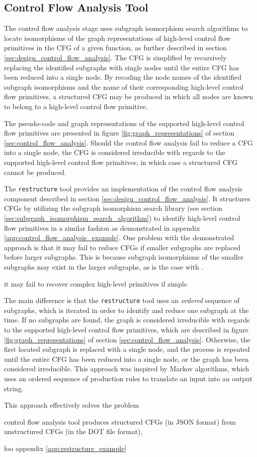 
\subsection{Control Flow Analysis Tool}
\label{sec:impl_control_flow_analysis_tool}

The control flow analysis stage uses subgraph isomorphism search algorithms to locate isomorphisms of the graph representations of high-level control flow primitives in the CFG of a given function, as further described in section \ref{sec:design_control_flow_analysis}. The CFG is simplified by recursively replacing the identified subgraphs with single nodes until the entire CFG has been reduced into a single node. By recoding the node names of the identified subgraph isomorphisms and the name of their corresponding high-level control flow primitives, a structured CFG may be produced in which all nodes are known to belong to a high-level control flow primitive.

The pseudo-code and graph representations of the supported high-level control flow primitives are presented in figure \ref{fig:graph_representations} of section \ref{sec:control_flow_analysis}. Should the control flow analysis fail to reduce a CFG into a single node, the CFG is considered irreducible with regards to the supported high-level control flow primitives; in which case a structured CFG cannot be produced.


The \texttt{restructure} tool provides an implementation of the control flow analysis component described in section \ref{sec:design_control_flow_analysis}. It structures CFGs by utilizing the subgraph isomorphism search library (see section \ref{sec:subgraph_isomorphism_search_algorithm}) to identify high-level control flow primitives in a similar fashion as demonstrated in appendix \ref{app:control_flow_analysis_example}. One problem with the demonstrated approach is that it may fail to reduce CFGs if smaller subgraphs are replaced before larger subgraphs. This is because subgraph isomorphisms of the smaller subgraphs may exist in the larger subgraphs, as is the case with .

it may fail to recover complex high-level primitives if simple


 The main difference is that the \texttt{restructure} tool uses an \textit{ordered} sequence of subgraphs, which is iterated in order to identify and reduce one subgraph at the time. If no subgraphs are found, the graph is considered irreducible with regards to the supported high-level control flow primitives, which are described in figure \ref{fig:graph_representations} of section \ref{sec:control_flow_analysis}. Otherwise, the first located subgraph is replaced with a single node, and the process is repeated until the entire CFG has been reduced into a single node, or the graph has been considered irreducible. This approach was inspired by Markov algorithms, which uses an ordered sequence of production rules to translate an input into an output string.

This approach effectively solves the problem


control flow analysis tool produces structured CFGs (in JSON format) from unstructured CFGs (in the DOT file format),

foo appendix \ref{app:restructure_example}
